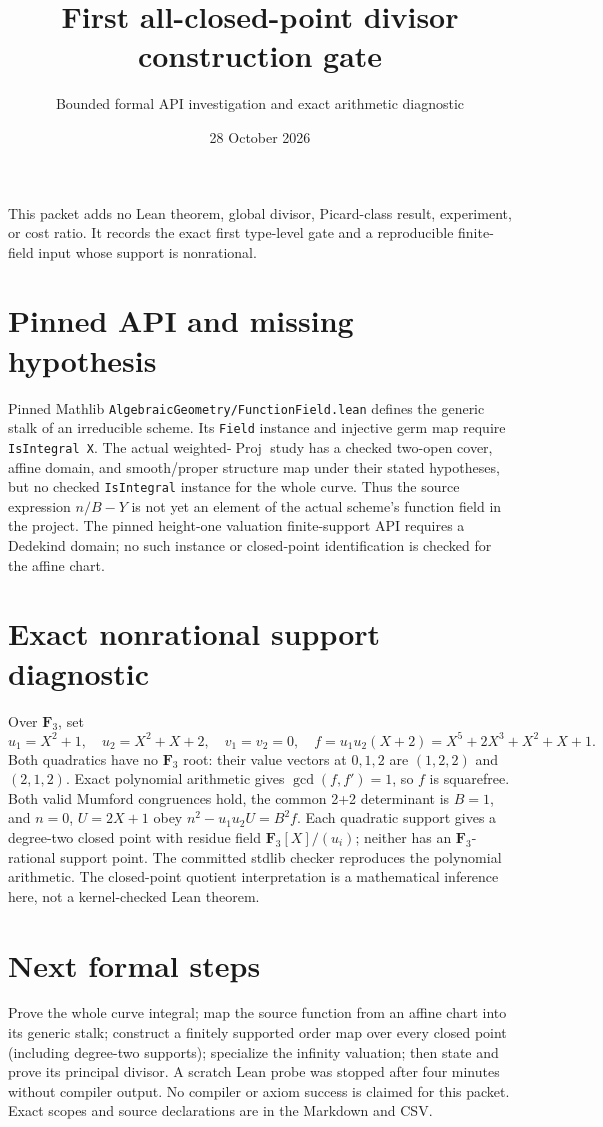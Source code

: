 \documentclass[10pt]{article}
\title{First all-closed-point divisor construction gate}
\author{Bounded formal API investigation and exact arithmetic diagnostic}
\date{28 October 2026}
\begin{document}
\maketitle
\noindent This packet adds no Lean theorem, global divisor, Picard-class result, experiment, or cost ratio. It records the exact first type-level gate and a reproducible finite-field input whose support is nonrational.

\section*{Pinned API and missing hypothesis}
Pinned Mathlib \texttt{AlgebraicGeometry/FunctionField.lean} defines the generic stalk of an irreducible scheme. Its \texttt{Field} instance and injective germ map require \texttt{IsIntegral X}. The actual weighted-$\operatorname{Proj}$ study has a checked two-open cover, affine domain, and smooth/proper structure map under their stated hypotheses, but no checked \texttt{IsIntegral} instance for the whole curve. Thus the source expression $n/B-Y$ is not yet an element of the actual scheme's function field in the project. The pinned height-one valuation finite-support API requires a Dedekind domain; no such instance or closed-point identification is checked for the affine chart.

\section*{Exact nonrational support diagnostic}
Over $\mathbf F_3$, set
\[
u_1=X^2+1,\quad u_2=X^2+X+2,\quad v_1=v_2=0,\quad
f=u_1u_2(X+2)=X^5+2X^3+X^2+X+1.
\]
Both quadratics have no $\mathbf F_3$ root: their value vectors at $0,1,2$ are $(1,2,2)$ and $(2,1,2)$. Exact polynomial arithmetic gives $\gcd(f,f')=1$, so $f$ is squarefree. Both valid Mumford congruences hold, the common 2+2 determinant is $B=1$, and $n=0$, $U=2X+1$ obey $n^2-u_1u_2U=B^2f$. Each quadratic support gives a degree-two closed point with residue field $\mathbf F_3[X]/(u_i)$; neither has an $\mathbf F_3$-rational support point. The committed stdlib checker reproduces the polynomial arithmetic. The closed-point quotient interpretation is a mathematical inference here, not a kernel-checked Lean theorem.

\section*{Next formal steps}
Prove the whole curve integral; map the source function from an affine chart into its generic stalk; construct a finitely supported order map over every closed point (including degree-two supports); specialize the infinity valuation; then state and prove its principal divisor. A scratch Lean probe was stopped after four minutes without compiler output. No compiler or axiom success is claimed for this packet. Exact scopes and source declarations are in the Markdown and CSV.
\end{document}
